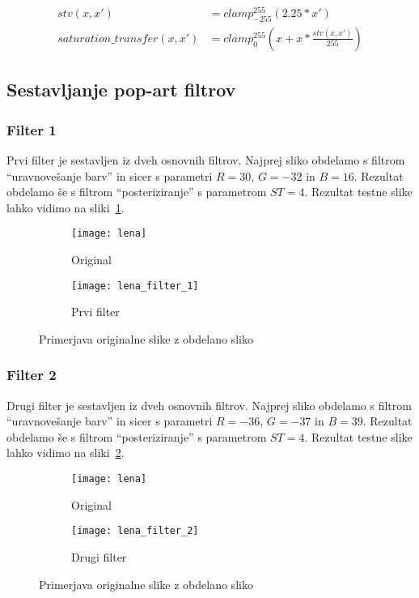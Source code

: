 \begin{align}
stv(x, x') &= clamp_{-255}^{255}(2.25 * x') \nonumber \\
saturation\_transfer(x, x') &= clamp_{0}^{255}(x + x * \frac{stv(x, x')}{255})
\end{align}


\subsection{Sestavljanje pop-art filtrov}
\label{sec:obdelavaSlikSestavljanjePopArt}

\subsubsection*{Filter 1}
Prvi filter je sestavljen iz dveh osnovnih filtrov. Najprej sliko obdelamo s
filtrom ``uravnovešanje barv'' in sicer s parametri $R = 30$, $G = -32$ in
$B = 16$. Rezultat obdelamo še s filtrom ``posteriziranje'' s parametrom
$ST =4$. Rezultat testne slike lahko vidimo na sliki~\ref{fig:lena_filter_1}.

\begin{figure}[!ht]
    \centering
    \begin{subfigure}[b]{0.4\textwidth}
        \texttt{[image: lena]}
        \caption{Original}
    \end{subfigure}
    \begin{subfigure}[b]{0.4\textwidth}
        \texttt{[image: lena\_filter\_1]}
        \caption{Prvi filter}
    \end{subfigure}
    \caption{Primerjava originalne slike z obdelano sliko}
    \label{fig:lena_filter_1}
\end{figure}


\subsubsection*{Filter 2}
Drugi filter je sestavljen iz dveh osnovnih filtrov. Najprej sliko obdelamo s
filtrom ``uravnovešanje barv'' in sicer s parametri $R = -36$, $G = -37$ in
$B = 39$. Rezultat obdelamo še s filtrom ``posteriziranje'' s parametrom
$ST = 4$. Rezultat testne slike lahko vidimo na sliki~\ref{fig:lena_filter_2}.

\begin{figure}[!ht]
    \centering
    \begin{subfigure}[b]{0.4\textwidth}
        \texttt{[image: lena]}
        \caption{Original}
    \end{subfigure}
    \begin{subfigure}[b]{0.4\textwidth}
        \texttt{[image: lena\_filter\_2]}
        \caption{Drugi filter}
    \end{subfigure}
    \caption{Primerjava originalne slike z obdelano sliko}
    \label{fig:lena_filter_2}
\end{figure}


